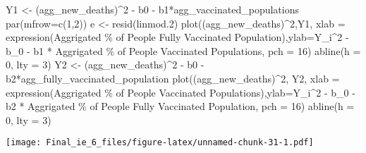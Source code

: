 \documentclass[
  12pt,
]{article}
\newenvironment{Shaded}{\begin{snugshade}}{\end{snugshade}}
\newcommand{\AttributeTok}[1]{\textcolor[rgb]{0.77,0.63,0.00}{#1}}
\newcommand{\DecValTok}[1]{\textcolor[rgb]{0.00,0.00,0.81}{#1}}
\newcommand{\FloatTok}[1]{\textcolor[rgb]{0.00,0.00,0.81}{#1}}
\newcommand{\FunctionTok}[1]{\textcolor[rgb]{0.00,0.00,0.00}{#1}}
\newcommand{\NormalTok}[1]{#1}
\newcommand{\OtherTok}[1]{\textcolor[rgb]{0.56,0.35,0.01}{#1}}
\newcommand{\SpecialCharTok}[1]{\textcolor[rgb]{0.00,0.00,0.00}{#1}}
\newcommand{\StringTok}[1]{\textcolor[rgb]{0.31,0.60,0.02}{#1}}
\begin{document}
\begin{Shaded}
\begin{Highlighting}[]
\NormalTok{Y1 }\OtherTok{\textless{}{-}}\NormalTok{ (agg\_new\_deaths)}\SpecialCharTok{\^{}}\DecValTok{2} \SpecialCharTok{{-}}\NormalTok{ b0 }\SpecialCharTok{{-}}\NormalTok{ b1}\SpecialCharTok{*}\NormalTok{agg\_vaccinated\_populations}
\FunctionTok{par}\NormalTok{(}\AttributeTok{mfrow=}\FunctionTok{c}\NormalTok{(}\DecValTok{1}\NormalTok{,}\DecValTok{2}\NormalTok{))}
\NormalTok{e }\OtherTok{\textless{}{-}} \FunctionTok{resid}\NormalTok{(linmod}\FloatTok{.2}\NormalTok{)}
\FunctionTok{plot}\NormalTok{((agg\_new\_deaths)}\SpecialCharTok{\^{}}\DecValTok{2}\NormalTok{,Y1, }\AttributeTok{xlab =} \FunctionTok{expression}\NormalTok{(}\StringTok{\textquotesingle{}Aggrigated \% of People Fully Vaccinated Population\textquotesingle{}}\NormalTok{),}\AttributeTok{ylab=}\StringTok{\textquotesingle{}Y\_i\^{}2 {-} b\_0 {-} b1 * Aggrigated \% of People Vaccinated Populations\textquotesingle{}}\NormalTok{, }\AttributeTok{pch =} \DecValTok{16}\NormalTok{)}
\FunctionTok{abline}\NormalTok{(}\AttributeTok{h =} \DecValTok{0}\NormalTok{, }\AttributeTok{lty =} \DecValTok{3}\NormalTok{)}
\NormalTok{Y2 }\OtherTok{\textless{}{-}}\NormalTok{ (agg\_new\_deaths)}\SpecialCharTok{\^{}}\DecValTok{2} \SpecialCharTok{{-}}\NormalTok{ b0 }\SpecialCharTok{{-}}\NormalTok{ b2}\SpecialCharTok{*}\NormalTok{agg\_fully\_vaccinated\_population}
\FunctionTok{plot}\NormalTok{((agg\_new\_deaths)}\SpecialCharTok{\^{}}\DecValTok{2}\NormalTok{, Y2, }\AttributeTok{xlab =} \FunctionTok{expression}\NormalTok{(}\StringTok{\textquotesingle{}Aggrigated \% of People Vaccinated Populations\textquotesingle{}}\NormalTok{),}\AttributeTok{ylab=}\StringTok{\textquotesingle{}Y\_i\^{}2 {-} b\_0 {-} b2 * Aggrigated \% of People Fully Vaccinated Population\textquotesingle{}}\NormalTok{, }\AttributeTok{pch =} \DecValTok{16}\NormalTok{)}
\FunctionTok{abline}\NormalTok{(}\AttributeTok{h =} \DecValTok{0}\NormalTok{, }\AttributeTok{lty =} \DecValTok{3}\NormalTok{)}
\end{Highlighting}
\end{Shaded}

\texttt{[image: Final\_ie\_6\_files/figure-latex/unnamed-chunk-31-1.pdf]}
\end{document}
